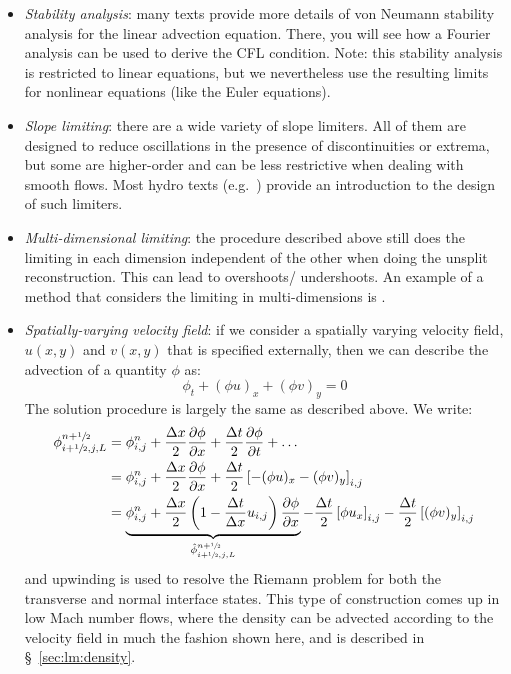 \begin{itemize}
\item {\em Stability analysis}: many texts provide more details of von
  Neumann stability analysis for the linear advection equation.
  There, you will see how a Fourier analysis can be used to derive the
  CFL condition.  Note: this stability analysis is restricted to
  linear equations, but we nevertheless use the resulting limits for
  nonlinear equations (like the Euler equations).

\item {\em Slope limiting}: there are a wide variety of slope limiters.
  All of them are designed to reduce oscillations in the presence
  of discontinuities or extrema, but some are higher-order and can be
  less restrictive when dealing with smooth flows.  Most hydro
  texts (e.g.\ \cite{leveque:2002,toro:1997}) provide an introduction to the design
  of such limiters.

\item {\em Multi-dimensional limiting}: the procedure described above
  still does the limiting in each dimension independent of the other
  when doing the unsplit reconstruction.  This can lead to overshoots/
  undershoots.  An example of a method that considers the limiting
  in multi-dimensions is \cite{BDS,quadBDS}.

\item {\em Spatially-varying velocity field}: if we consider a spatially
  varying velocity field, $u(x,y)$ and $v(x,y)$ that is specified externally,
  then we can describe the advection of a quantity $\phi$ as:
  \begin{equation}
  \phi_t + (\phi u)_x + (\phi v)_y = 0
  \end{equation}
  The solution procedure is largely the same as described above.  We write:
\begin{align}
\phi_{i+\myhalf,j,L}^{n+\myhalf} &= \phi_{i,j}^n + 
   \frac{\Delta x}{2} \frac{\partial \phi}{\partial x} +
   \frac{\Delta t}{2} \frac{\partial \phi}{\partial t} + \ldots \nonumber \\
%
 &= \phi_{i,j}^n + 
    \frac{\Delta x}{2} \frac{\partial \phi}{\partial x} +
    \frac{\Delta t}{2} \left [ -(\phi u)_x -(\phi v)_y \right ]_{i,j} \nonumber\\
%
 &= \underbrace{\phi_{i,j}^n + 
   \frac{\Delta x}{2} \left ( 1 - \frac{\Delta t}{\Delta x} u_{i,j} \right )
        \frac{\partial \phi}{\partial x}}_{\hat{\phi}_{i+\myhalf,j,L}^{n+\myhalf}}
   - \frac{\Delta t}{2} \left [\phi u_x \right ]_{i,j} 
   - \frac{\Delta t}{2} \left [ (\phi v)_y \right ]_{i,j}
\end{align}
  and upwinding is used to resolve the Riemann problem for both the
  transverse and normal interface states.  This type of construction
  comes up in low Mach number flows, where the density can be advected
  according to the velocity field in much the fashion shown here, and
  is described in \S~\ref{sec:lm:density}.


\end{itemize}
